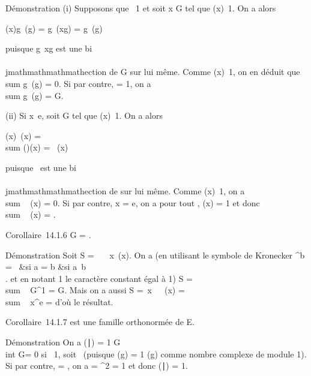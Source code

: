 Démonstration (i) Supposons que \chi\neq~1 et soit x
\in G tel que \chi(x)\neq~1. On a alors

\chi(x)\sum g\inG~\chi(g) =
\sum g\inG~\chi(xg) =
\sum g\inG~\chi(g)

puisque g\mapsto~xg est une bi\\\\jmathmathmathmathection de G sur lui
même. Comme \chi(x)\neq~1, on en déduit que
\\sum  g\inG~\chi(g)
= 0. Si par contre, \chi = 1, on a
\\sum  g\inG~\chi(g)
= \textbar{}G\textbar{}.

(ii) Si x\neq~e, soit \phi \in\hat
G tel que \phi(x)\neq~1. On a alors

\phi(x)\sum \chi\in\hatG~\chi(x)
= \\sum
\chi\in\hatG(\phi\chi)(x) =
\sum \chi\in\hatG~\chi(x)

puisque \chi\mapsto~\phi\chi est une bi\\\\jmathmathmathmathection de
\hatG sur lui même. Comme
\phi(x)\neq~1, on a
\\sum ~
\chi\in\hatG\chi(x) = 0. Si par contre, x = e, on a
pour tout \chi, \chi(x) = 1 et donc
\\sum ~
\chi\in\hatG\chi(x) =
\textbar{}\hatG\textbar{}.

Corollaire~14.1.6 \textbar{}G\textbar{} =
\textbar{}\hatG\textbar{}.

Démonstration Soit S =\
\sum ~
\chi\in\hatG\
\sum  x\inG~\chi(x). On a (en utilisant le
symbole de Kronecker \deltaa^b = \left
\ \cases 1&si a = b
&si a\neq~b\\ 
\right . et en notant 1 le caractère constant égal à 1) S
= \\sum ~
\chi\in\hatG\textbar{}G\textbar{}\delta\chi^1
= \textbar{}G\textbar{}. Mais on a aussi S =\
\sum  x\inG~\
\sum  \chi\in\hatG~\chi(x)
= \\sum ~
x\inG\textbar{}\hatG\textbar{}\deltax^e
= \textbar{}\hatG\textbar{} d'où le résultat.

Corollaire~14.1.7 \hatG est une famille orthonormée
de E.

Démonstration On a (\chi∣\phi) = 1
\over \textbar{}G\textbar{} \\int
 G\overline\chi\phi = 0 si
\overline\chi\phi\neq~1, soit
\chi\neq~\phi (puisque \overline\chi(g)
= 1 \over \chi(g) comme nombre complexe de module 1). Si
par contre, \chi = \phi, on a \overline\chi\phi =
\textbar{}\chi\textbar{}^2 = 1 et donc
(\chi∣\phi) = 1.


